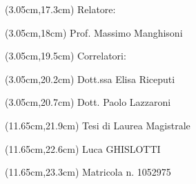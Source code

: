 \begin{textblock*}{\textwidth}(3.05cm,17.3cm) 
    Relatore:
\end{textblock*}
\begin{textblock*}{\textwidth}(3.05cm,18cm)
    Prof. Massimo Manghisoni
\end{textblock*}

\begin{textblock*}{\textwidth}(3.05cm,19.5cm)
    Correlatori:
\end{textblock*}
\begin{textblock*}{\textwidth}(3.05cm,20.2cm)
    Dott.ssa Elisa Riceputi
\end{textblock*}
\begin{textblock*}{\textwidth}(3.05cm,20.7cm) 
    Dott. Paolo Lazzaroni
\end{textblock*}

\begin{textblock*}{\textwidth}(11.65cm,21.9cm)
    Tesi di Laurea Magistrale
\end{textblock*}
\begin{textblock*}{\textwidth}(11.65cm,22.6cm)
    Luca GHISLOTTI
\end{textblock*}
\begin{textblock*}{\textwidth}(11.65cm,23.3cm) 
    Matricola n. 1052975
\end{textblock*}